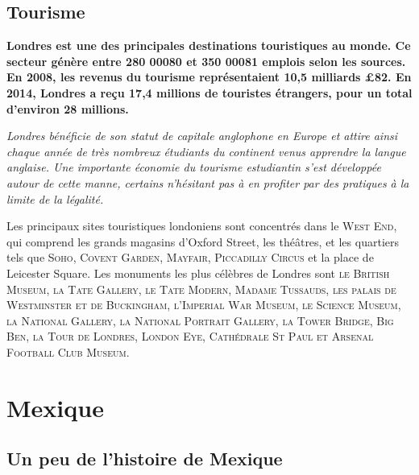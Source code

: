 \documentclass{article}
\begin{document}
\subsection{Tourisme}

\textbf{Londres est une des principales destinations touristiques au monde. Ce secteur génère entre 280 00080 et 350 00081 emplois selon les sources. En 2008, les revenus du tourisme représentaient 10,5 milliards £82. En 2014, Londres a reçu 17,4 millions de touristes étrangers, pour un total d'environ 28 millions.}

\textit{Londres bénéficie de son statut de capitale anglophone en Europe et attire ainsi chaque année de très nombreux étudiants du continent venus apprendre la langue anglaise. Une importante économie du tourisme estudiantin s'est développée autour de cette manne, certains n'hésitant pas à en profiter par des pratiques à la limite de la légalité.}

Les principaux sites touristiques londoniens sont concentrés dans le \textsc{West End}, qui comprend les grands magasins d’Oxford Street, les théâtres, et les quartiers tels que \textsc{Soho, Covent Garden, Mayfair, Piccadilly Circus} et la place de Leicester Square. Les monuments les plus célèbres de Londres sont \textsc{le British Museum, la Tate Gallery, le Tate Modern, Madame Tussauds, les palais de Westminster et de Buckingham, l’Imperial War Museum, le Science Museum, la National Gallery, la National Portrait Gallery, la Tower Bridge, Big Ben, la Tour de Londres, London Eye, Cathédrale St Paul et Arsenal Football Club Museum}.

\newpage

\section{Mexique}
\subsection{Un peu de l'histoire de Mexique}
\ \\ 
\begin{center}

\end{center}

\newpage
\end{document}
